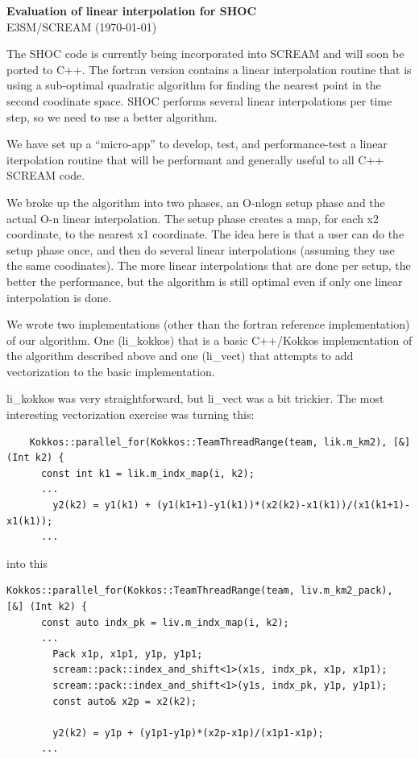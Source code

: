 \documentclass[10pt,twocolumn]{article}
\begin{document}
\sloppy

\onecolumn

\begin{center}
  {\bf Evaluation of linear interpolation for SHOC} \\
  E3SM/SCREAM (\today)
\end{center}


The SHOC code is currently being incorporated into SCREAM and will soon be ported to
C++. The fortran version contains a linear interpolation routine that is using a
sub-optimal quadratic algorithm for finding the nearest point in the second coodinate
space. SHOC performs several linear interpolations per time step, so we need to
use a better algorithm.

We have set up a ``micro-app'' to develop, test, and performance-test a linear
iterpolation routine that will be performant and generally useful to all C++ SCREAM
code.


We broke up the algorithm into two phases, an O-nlogn setup phase and the actual
O-n linear interpolation. The setup phase creates a map, for each x2 coordinate, to
the nearest x1 coordinate. The idea here is that a user can do the setup phase once, and
then do several linear interpolations (assuming they use the same coodinates). The more
linear interpolations that are done per setup, the better the performance, but the algorithm
is still optimal even if only one linear interpolation is done.

We wrote two implementations (other than the fortran reference implementation) of our
algorithm. One (li\_kokkos) that is a basic C++/Kokkos implementation of the algorithm
described above and one (li\_vect) that attempts to add vectorization to the basic implementation.

li\_kokkos was very straightforward, but li\_vect was a bit trickier. The most interesting
vectorization exercise was turning this:


\begin{verbatim}
    Kokkos::parallel_for(Kokkos::TeamThreadRange(team, lik.m_km2), [&] (Int k2) {
      const int k1 = lik.m_indx_map(i, k2);
      ...
        y2(k2) = y1(k1) + (y1(k1+1)-y1(k1))*(x2(k2)-x1(k1))/(x1(k1+1)-x1(k1));
      ...
\end{verbatim}

into this

\begin{verbatim}
Kokkos::parallel_for(Kokkos::TeamThreadRange(team, liv.m_km2_pack), [&] (Int k2) {
      const auto indx_pk = liv.m_indx_map(i, k2);
      ...
        Pack x1p, x1p1, y1p, y1p1;
        scream::pack::index_and_shift<1>(x1s, indx_pk, x1p, x1p1);
        scream::pack::index_and_shift<1>(y1s, indx_pk, y1p, y1p1);
        const auto& x2p = x2(k2);

        y2(k2) = y1p + (y1p1-y1p)*(x2p-x1p)/(x1p1-x1p);
      ...
\end{verbatim}
\end{document}
